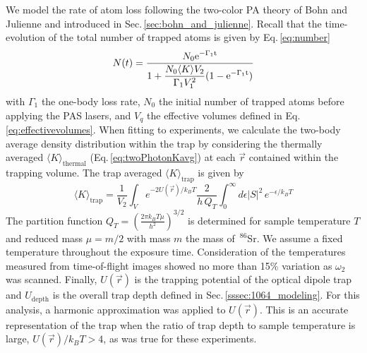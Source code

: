 We model the rate of atom loss following the two-color PA theory of Bohn and Julienne and introduced in Sec.\,\ref{sec:bohn_and_julienne}.
Recall that the time-evolution of the total number of trapped atoms is given by Eq.\,\ref{eq:number}
\begin{equation*} \label{eq:4num}
   N(t)= \frac{ \displaystyle N_0 \rm{e}^{-\Gamma_1 t}}
   		{ \displaystyle 1 + \frac{N_0 \langle K \rangle V_2}{\Gamma_1 V_1^2}(1-\rm{e}^{-\Gamma_1 t}) }
\end{equation*}
with $\Gamma_1$ the one-body loss rate, $N_0$ the initial number of trapped atoms before applying the PAS lasers, and $V_q$ the effective volumes defined in Eq.\,\ref{eq:effectivevolumes}.
When fitting to experiments, we calculate the two-body average density distribution within the trap by considering the thermally averaged $\langle K \rangle_{\text{thermal}}$ (Eq.\,\ref{eq:twoPhotonKavg}) at each $\vec{r}$ contained within the trapping volume.
The trap averaged $\langle K \rangle_\text{trap}$ is given by
\begin{equation} \label{eq:chap4avgK}
	\langle K \rangle_\text{trap} = \frac{1}{V_2} \int_V e^{-2 U(\vec{r})/k_{B}T} \frac{2}{h\,Q_{T}} \int_{0}^{\infty} d\epsilon \vert S \vert^2 \,e^{-\epsilon/k_{B}T}
\end{equation}
The partition function $Q_{T}=\left( \frac{2\pi k_{B}T \mu}{ h^2 }\right) ^{3/2}$ is determined for sample temperature $T$ and reduced mass $\mu = m/2$ with mass $m$ the mass of $\,^{86}$Sr.
We assume a fixed temperature throughout the exposure time.
Consideration of the temperatures measured from time-of-flight images showed no more than 15\% variation as $\omega_2$ was scanned.
Finally, $U(\vec{r})$ is the trapping potential of the optical dipole trap and $U_{\text{depth}}$ is the overall trap depth defined in Sec.\,\ref{sssec:1064_modeling}.
For this analysis, a harmonic approximation was applied to $U(\vec{r})$.
This is an accurate representation of the trap when the ratio of trap depth to sample temperature is large, $U(\vec{r})/k_B T > 4$, as was true for these experiments.

